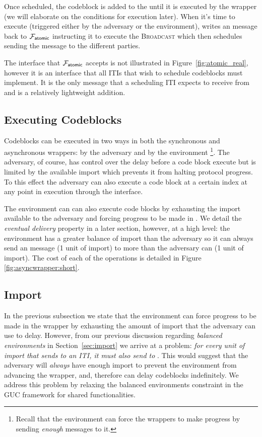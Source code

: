 Once scheduled, the codeblock is added to the  until it is executed by the wrapper (we will elaborate on the conditions for execution later).
When it's time to execute (triggered either by the adversary or the environment), \Wasync writes an \Exec message back to $\mathcal{F}_{{\mathsf {atomic}}}$ instructing it to execute the \textsc{Broadcast} which then schedules sending the message to the different parties. 

The \Exec interface that $\mathcal{F}_{{\mathsf {atomic}}}$ accepts is not illustrated in Figure~\ref{fig:atomic_real}, however it is an interface that all ITIs that wish to schedule codeblocks must implement.
It is the only message that a scheduling ITI expects to receive from \Wasync and is a relatively lightweight addition. 

\subsection{Executing Codeblocks}
Codeblocks can be executed in two ways in both the synchronous and asynchronous wrappers: by the adversary and by the environment \footnote{Recall that the environment can force the wrappers to make progress by sending {\em enough} \Advance messages to it.}.
The adversary, of course, has control over the delay before a code block execute but is limited by the available import which prevents it from halting protocol progress.
To this effect the adversary can also execute a code block at a certain index at any point in execution through the \Exec interface.

The environment can can also execute code blocks by exhausting the import available to the adversary and forcing progress to be made in \Wasync.
We detail the {\em eventual delivery} property in a later section, however, at a high level: the environment has a greater balance of import than the adversary so it can always send an \Advance message (1 unit of import) to \Wasync more than the adversary can \Delay (1 unit of import).
The cost of each of the operations is detailed in Figure \ref{fig:asyncwrapper:short}.


\subsection{Import}
In the previous subsection we state that the environment can force progress to be made in the wrapper by exhausting the amount of import that the adversary can use to delay.
However, from our previous discussion regarding \textit{balanced environments} in Section~\ref{sec:import} we arrive at a problem: \textit{for every unit of import that \Environment sends to an ITI, it must also send to \Adversary}.
This would suggest that the adversary will \textit{always} have enough import to prevent the environment from advancing the wrapper, and, therefore \Adversary can delay codeblocks indefinitely.
We address this problem by relaxing the balanced environments constraint in the GUC framework for shared functionalities.

